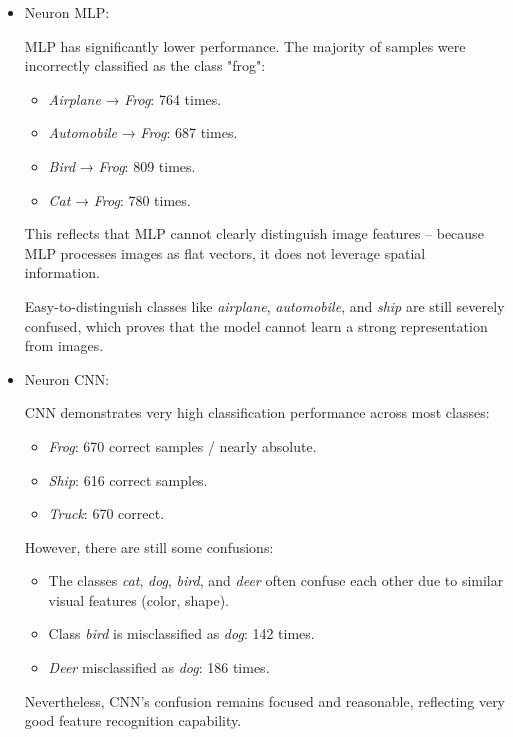 \documentclass[12pt]{article}
\begin{document}
\begin{itemize}
    \item Neuron MLP:

     MLP has significantly lower performance. The majority of samples were 
     incorrectly classified as the class "frog":

    \begin{itemize}
        \item \textit{Airplane} → \textit{Frog}: 764 times.
        \item \textit{Automobile} → \textit{Frog}: 687 times.
        \item \textit{Bird} → \textit{Frog}: 809 times.
        \item \textit{Cat} → \textit{Frog}: 780 times.
    \end{itemize}

    This reflects that MLP cannot clearly distinguish image features – because 
    MLP processes images as flat vectors, it does not leverage spatial 
    information.
    
    Easy-to-distinguish classes like \textit{airplane}, \textit{automobile}, 
    and \textit{ship} are still severely confused, which proves that the model 
    cannot learn a strong representation from images.

    \item Neuron CNN:

    CNN demonstrates very high classification performance across most classes:

    \begin{itemize}
        \item \textit{Frog}: 670 correct samples / nearly absolute.
        \item \textit{Ship}: 616 correct samples.
        \item \textit{Truck}: 670 correct.
    \end{itemize}

    However, there are still some confusions:

    \begin{itemize}
        \item The classes \textit{cat}, \textit{dog}, \textit{bird}, and 
        \textit{deer} often confuse each other due to similar visual features 
        (color, shape).
        \item Class \textit{bird} is misclassified as \textit{dog}: 142 times.
        \item \textit{Deer} misclassified as \textit{dog}: 186 times.
    \end{itemize}

    Nevertheless, CNN's confusion remains focused and reasonable, reflecting 
    very good feature recognition capability.
\end{itemize}
\end{document}
